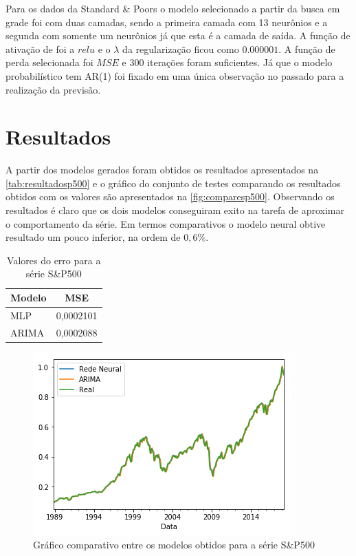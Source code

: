 \documentclass[
    12pt,
    oneside,
    a4paper,
    english,
    brazil
]{abntex2}
\begin{document}
Para os dados  da Standard \& Poors  o modelo selecionado a partir  da busca em
grade  foi com  duas camadas,  sendo a  primeira camada  com 13  neurônios e  a
segunda com somente um  neurônios já que esta é a camada de  saída. A função de
ativação de foi a $relu$ e  o $\lambda$ da regularização ficou como $0.000001$.
A função de  perda selecionada foi $MSE$ e 300  iterações foram suficientes. Já
que  o modelo  probabilístico  tem AR(1)  foi fixado  em  uma única  observação
no passado para a realização da previsão.

\chapter{Resultados}\label{chap:result}

A  partir  dos  modelos  gerados   foram  obtidos  os  resultados  apresentados
na   \autoref{tab:resultadosp500}   e  o   gráfico   do   conjunto  de   testes
comparando  os   resultados  obtidos  com   os  valores  são   apresentados  na
\autoref{fig:comparesp500}.  Observando  os  resultados  é claro  que  os  dois
modelos conseguiram exito  na tarefa de aproximar o comportamento  da série. Em
termos  comparativos o  modelo neural  obtive resultado  um pouco  inferior, na
ordem de $0,6\%$.

\begin{table}[ht]
    \centering
    \caption{Valores do erro para a série S\&P500}\label{tab:resultadosp500}
    \begin{tabular}{ll}
        \multicolumn{1}{c}{Modelo} & \multicolumn{1}{c}{MSE} \\
        \toprule
        MLP                        & 0,0002101               \\
        ARIMA                      & 0,0002088
    \end{tabular}
\end{table}

\begin{figure}[ht]
    \centering
    \caption{Gráfico comparativo entre os modelos obtidos para a série
    S\&P500}\label{fig:comparesp500}
    \includegraphics[width=.5\linewidth]{images/sp500_prediction_compare.png}
\end{figure}
\end{document}
